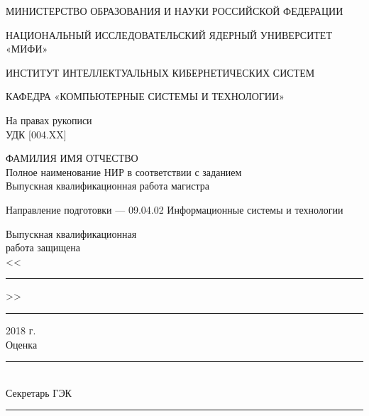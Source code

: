 \documentclass[a4paper,12pt]{article}
\begin{document}

\renewcommand{\refname}{\centerline{СПИСОК ИСПОЛЬЗОВАННЫХ ИСТОЧНИКОВ}} 
\renewcommand{\contentsname}{\centerline{СОДЕРЖАНИЕ}} 

%
%
\thispagestyle{empty}



\begin{center}
\doublespacing

МИНИСТЕРСТВО ОБРАЗОВАНИЯ И НАУКИ РОССИЙСКОЙ ФЕДЕРАЦИИ

НАЦИОНАЛЬНЫЙ ИССЛЕДОВАТЕЛЬСКИЙ ЯДЕРНЫЙ УНИВЕРСИТЕТ «МИФИ»

ИНСТИТУТ ИНТЕЛЛЕКТУАЛЬНЫХ КИБЕРНЕТИЧЕСКИХ СИСТЕМ

КАФЕДРА «КОМПЬЮТЕРНЫЕ СИСТЕМЫ И ТЕХНОЛОГИИ»
\end{center}

\onehalfspacing

\vspace{1cm}
\begin{flushright}
На правах рукописи\\
УДК [\large 004.XX]
\end{flushright}

\vspace{1cm}

\begin{center}
\doublespacing
\large 
ФАМИЛИЯ ИМЯ ОТЧЕСТВО\\

Полное наименование НИР в соответствии с заданием\\

Выпускная квалификационная работа магистра
\end{center}

\begin{center}
Направление подготовки ---  09.04.02 Информационные системы и технологии\\
\end{center}

\vspace{2cm}

\begin{flushright}
\begin{minipage}{60mm}
Выпускная квалификационная\\
работа защищена\\
<<\rule{10mm}{0.15mm}>>\rule{32mm}{0.15mm}2018 г.\\
Оценка \rule{43mm}{0.15mm}\\
Секретарь ГЭК \rule{27mm}{0.15mm}
\end{minipage}
\end{flushright}
\end{document}
